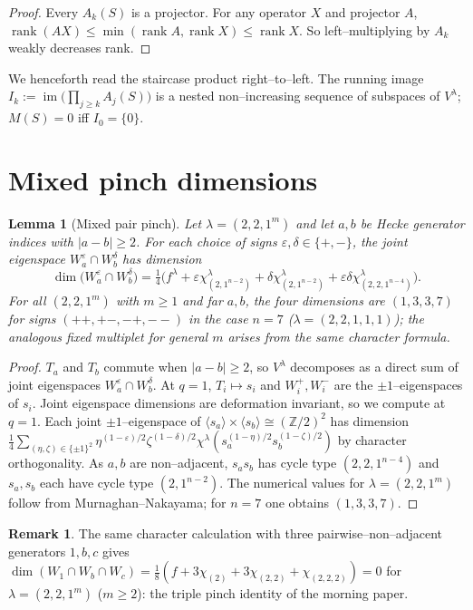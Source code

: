 \documentclass[11pt]{article}
\newtheorem{lemma}[theorem]{Lemma}
\theoremstyle{definition}
\newtheorem{remark}[theorem]{Remark}
\DeclareMathOperator{\rank}{rank}
\DeclareMathOperator{\im}{im}
\newcommand{\la}{\lambda}
\newcommand{\W}{W}
\begin{document}
\begin{proof}
Every $A_k(S)$ is a projector. For any operator $X$ and projector $A$,
$\rank(AX)\le\min(\rank A,\rank X)\le\rank X$. So left--multiplying by $A_{k}$
weakly decreases rank.
\end{proof}

We henceforth read the staircase product right--to--left. The running image
$I_k:=\im\bigl(\prod_{j\ge k}A_j(S)\bigr)$ is a nested non--increasing sequence of
subspaces of $V^\la$; $M(S)=0$ iff $I_0=\{0\}$.

\section{Mixed pinch dimensions}

\begin{lemma}[Mixed pair pinch]\label{lem:mixedpinch}
Let $\la=(2,2,1^m)$ and let $a,b$ be Hecke generator indices with $|a-b|\ge2$.
For each choice of signs $\varepsilon,\delta\in\{+,-\}$, the joint eigenspace
$\W_a^{\varepsilon}\cap\W_b^{\delta}$ has dimension
\[
\dim\bigl(\W_a^{\varepsilon}\cap\W_b^{\delta}\bigr)=
\tfrac14\bigl(f^\la+\varepsilon\chi^\la_{(2,1^{n-2})}
+\delta\chi^\la_{(2,1^{n-2})}+\varepsilon\delta\chi^\la_{(2,2,1^{n-4})}\bigr).
\]
For all $(2,2,1^m)$ with $m\ge1$ and far $a,b$, the four dimensions are
$(1,3,3,7)$ for signs $(++,+-,-+,--)$ in the case $n=7$
\textup{(}$\la=(2,2,1,1,1)$\textup{)}; the analogous fixed multiplet for general $m$
arises from the same character formula.
\end{lemma}

\begin{proof}
$T_a$ and $T_b$ commute when $|a-b|\ge2$, so $V^\la$ decomposes as a direct
sum of joint eigenspaces $\W_a^\varepsilon\cap\W_b^\delta$. At $q=1$,
$T_i\mapsto s_i$ and $\W_i^+,\W_i^-$ are the $\pm1$--eigenspaces of $s_i$.
Joint eigenspace dimensions are deformation invariant, so we compute at
$q=1$. Each joint $\pm1$--eigenspace of $\langle s_a\rangle\times\langle
s_b\rangle\cong(\mathbb Z/2)^2$ has dimension
$\tfrac14\sum_{(\eta,\zeta)\in\{\pm1\}^2}\eta^{(1-\varepsilon)/2}
\zeta^{(1-\delta)/2}\chi^\la(s_a^{(1-\eta)/2}s_b^{(1-\zeta)/2})$ by character
orthogonality. As $a,b$ are non--adjacent, $s_a s_b$ has cycle type
$(2,2,1^{n-4})$ and $s_a,s_b$ each have cycle type $(2,1^{n-2})$. The numerical
values for $\la=(2,2,1^m)$ follow from Murnaghan--Nakayama; for $n=7$ one
obtains $(1,3,3,7)$.
\end{proof}

\begin{remark}
The same character calculation with three pairwise--non--adjacent generators
$1,b,c$ gives $\dim(\W_1\cap\W_b\cap\W_c)=\tfrac18(f+3\chi_{(2)}+3\chi_{(2,2)}+
\chi_{(2,2,2)})=0$ for $\la=(2,2,1^m)$ ($m\ge2$): the triple pinch identity
of the morning paper.
\end{remark}
\end{document}
